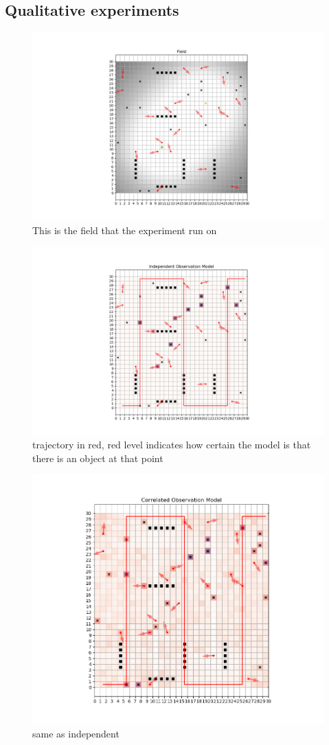 \documentclass{article}
\begin{document}
	\subsection{Qualitative experiments}
	\begin{figure}
		\centering
		\includegraphics[width=0.7\linewidth, height=0.3\textheight]{../figures/ind_vs_corr_field_only}
		\caption[qualitative experiment field]{This is the field that the experiment run on}
		\label{fig:indvscorrfieldonly}
	\end{figure}
	\begin{figure}
		\centering
		\includegraphics[width=0.7\linewidth, height=0.3\textheight]{../figures/ind_vs_corr_independent_agent}
		\caption[independent model results]{trajectory in red, red level indicates how certain the model is that there is an object at that point}
		\label{fig:indvscorrindependentagent}
	\end{figure}
	\begin{figure}
		\centering
		\includegraphics[width=0.7\linewidth, height=0.3\textheight]{../figures/ind_vs_corr_correlated_agent}
		\caption[Correlated model results]{same as independent}
		\label{fig:indvscorrcorrelatedagent}
	\end{figure}
\end{document}
